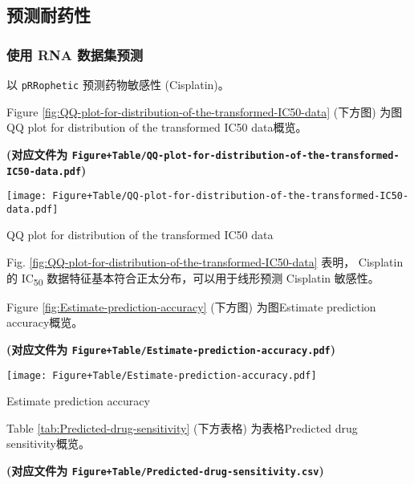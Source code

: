 \documentclass[
]{article}
\begin{document}
\hypertarget{ux9884ux6d4bux8010ux836fux6027}{%
\subsection{预测耐药性}\label{ux9884ux6d4bux8010ux836fux6027}}

\hypertarget{ux4f7fux7528-rna-ux6570ux636eux96c6ux9884ux6d4b}{%
\subsubsection{使用 RNA 数据集预测}\label{ux4f7fux7528-rna-ux6570ux636eux96c6ux9884ux6d4b}}

以 \texttt{pRRophetic} 预测药物敏感性 (Cisplatin)。

Figure \ref{fig:QQ-plot-for-distribution-of-the-transformed-IC50-data} (下方图) 为图QQ plot for distribution of the transformed IC50 data概览。

\textbf{(对应文件为 \texttt{Figure+Table/QQ-plot-for-distribution-of-the-transformed-IC50-data.pdf})}

\def\@captype{figure}
\begin{center}
\texttt{[image: Figure+Table/QQ-plot-for-distribution-of-the-transformed-IC50-data.pdf]}
\caption{QQ plot for distribution of the transformed IC50 data}\label{fig:QQ-plot-for-distribution-of-the-transformed-IC50-data}
\end{center}

Fig. \ref{fig:QQ-plot-for-distribution-of-the-transformed-IC50-data} 表明，
Cisplatin 的 IC\textsubscript{50} 数据特征基本符合正太分布，可以用于线形预测 Cisplatin 敏感性。

Figure \ref{fig:Estimate-prediction-accuracy} (下方图) 为图Estimate prediction accuracy概览。

\textbf{(对应文件为 \texttt{Figure+Table/Estimate-prediction-accuracy.pdf})}

\def\@captype{figure}
\begin{center}
\texttt{[image: Figure+Table/Estimate-prediction-accuracy.pdf]}
\caption{Estimate prediction accuracy}\label{fig:Estimate-prediction-accuracy}
\end{center}

Table \ref{tab:Predicted-drug-sensitivity} (下方表格) 为表格Predicted drug sensitivity概览。

\textbf{(对应文件为 \texttt{Figure+Table/Predicted-drug-sensitivity.csv})}
\end{document}
